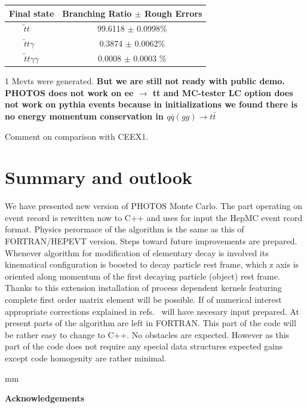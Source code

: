\documentclass[]{Photos_interface_design}
\begin{document}
\vspace{0.3cm} 
\begin{center}
{ \begin{tabular}{|c|c |} 
\hline 
Final state &  Branching Ratio  $\pm$ Rough Errors \\  
\hline 
\hline 
{$ \widetilde{t} t \; \;\; \;$}  &  {99.6118 $\pm$  0.0998\%}  \\ 
\hline 
 {$  \widetilde{t} t \gamma \;\;$} &   { 0.3874 $\pm$  0.0062\%}   \\ 
\hline 
{$  \widetilde{t} t \gamma \gamma$}  &  { 0.0008 $\pm$  0.0003 \%}  \\ 
\hline 
\end{tabular} 
}  
\end{center} 
1 Mevts were generated. 
{\bf But we are still not ready with public demo. PHOTOS does not work on ee $\to $ tt
and MC-tester LC option does not work on pythia events because in initializations 
we found there is no energy momentum conservation in $q \bar q (gg) \to t \bar t$}

Comment on comparison with CEEX1.


\section{Summary and outlook}
We have presented new version  of PHOTOS Monte Carlo. The part operating on 
event record is rewritten now to C++ and uses for input the HepMC event rcord 
format. Physics perormace of the algorithm is the same  as this of 
FORTRAN/HEPEVT version. Steps toward future improvements are prepared. 
Whenever algorithm for modification of elementary decay is involved its 
kinematical configuration is boosted to decay particle rest frame, which 
z axis is oriented along momentum of the first decaying particle (object) 
rest frame. Thanks to this extension  installation of process dependent 
kernels featuring complete first order matrix element will be possible.
If of numerical interest appropriate corrections explained in 
refs.~\cite{Golonka:2006tw,Nanava:2006vv,Nanava:2009vg}  will have necesary input prepared.
At present parts of the algorithm are left in FORTRAN. This part of the code 
will be rather easy to change to C++. No obstacles are expected. However as this part of the code does not require any special data structures expected gains
except code homogenity are rather minimal.  

 mm

\centerline{\large\bf Acknowledgements}
\end{document}
